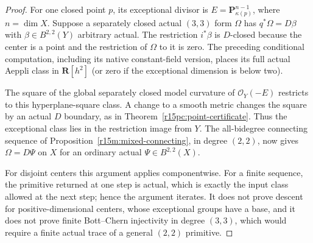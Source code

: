 \begin{proof}
For one closed point $p$, its exceptional divisor is
$E=\mathbf P^{n-1}_{\kappa(p)}$, where $n=\dim X$.
Suppose a separately closed actual $(3,3)$ form
$\Omega$ has $q^*\Omega=D\beta$ with
$\beta\in B^{2,2}(Y)$ arbitrary actual. The restriction
$i^*\beta$ is $D$-closed because the center is a point
and the restriction of $\Omega$ to it is zero.
The preceding conditional computation, including its
native constant-field version, places its full actual
Aeppli class in $\mathbf R[h^2]$ (or zero if the
exceptional dimension is below two).

The square of the global separately closed model
curvature of $\mathcal O_Y(-E)$ restricts to this
hyperplane-square class. A change to a smooth metric
changes the square by an actual $D$ boundary, as in
Theorem~\ref{r15pc:point-certificate}. Thus the
exceptional class lies in the restriction image from
$Y$. The all-bidegree connecting sequence
of Proposition~\ref{r15m:mixed-connecting}, in degree
$(2,2)$, now gives $\Omega=D\Psi$ on $X$ for an
ordinary actual $\Psi\in B^{2,2}(X)$.

For disjoint centers this argument applies componentwise.
For a finite sequence, the primitive returned at one
step is actual, which is exactly the input class allowed
at the next step; hence the argument iterates. It does
not prove descent for positive-dimensional centers,
whose exceptional groups have a base, and it does not
prove finite Bott--Chern injectivity in degree $(3,3)$,
which would require a finite actual trace of a general
$(2,2)$ primitive.
\end{proof}

